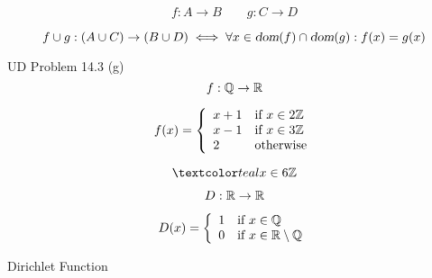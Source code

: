 \begin{frame}{}
  \[
    f: A \to B \qquad g: C \to D
  \]

  \begin{center}
  \end{center}

  \pause
  \begin{theorem}
    \[
      f \cup g: (A \cup C) \to (B \cup D) \iff
      \forall x \in \textsl{dom}(f) \cap \textsl{dom}(g): f(x) = g(x)
    \]
  \end{theorem}

  \pause
  \begin{exampleblock}{UD Problem 14.3 (g)}
    \[
      f: \mathbb{Q} \to \mathbb{R}{}
    \]

    \[
      f(x) = \left\{\begin{array}{ll}
	x + 1 & \text{if } x \in 2\mathbb{Z}{} \\
	x - 1 & \text{if } x \in 3\mathbb{Z}{} \\
	2     & \text{otherwise}
      \end{array}\right.
    \]
  \end{exampleblock}

  \pause
  \vspace{-0.30cm}
  \[
    \teal{x \in 6\integer{}}
  \]
\end{frame}

% 
% 

\begin{frame}{}
  \[
    D: \mathbb{R}{} \to \mathbb{R}{}
  \]

  \[
    D(x) = \left\{\begin{array}{ll}
      1 & \text{if } x \in \mathbb{Q} \\
      0 & \text{if } x \in \mathbb{R} \setminus \mathbb{Q} 
    \end{array}\right.
  \]

  \vspace{0.60cm}
  \centerline{Dirichlet Function}
\end{frame}
